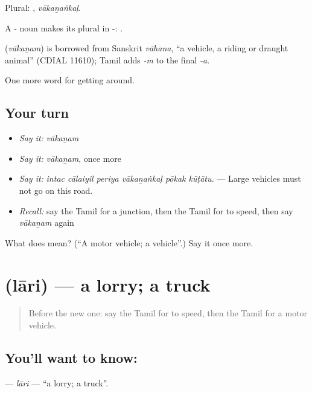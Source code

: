 Plural: , \emph{vākaṉaṅkaḷ}.

A - noun makes its plural in -: .

\begin{cousinweb}
\textbf{} (\emph{vākaṉam}) is borrowed from Sanskrit \emph{vāhana}, \textquotedblleft{}a vehicle, a riding or draught animal\textquotedblright{} (CDIAL 11610); Tamil adds \emph{-m} to the final \emph{-a}.
\end{cousinweb}

\begin{grammarlens}[title={What you've built}]
One more word for getting around.
\end{grammarlens}

\subsection*{Your turn}
\begin{itemize}
\raggedright
  \item \emph{Say it:} \emph{vākaṉam}
  \item \emph{Say it:} \emph{vākaṉam}, once more
  \item \emph{Say it:} \emph{intac cālaiyil periya vākaṉaṅkaḷ pōkak kūṭātu.} — Large vehicles must not go on this road.
  \item \emph{Recall:} say the Tamil for a junction, then the Tamil for to speed, then say \emph{vākaṉam} again
\end{itemize}

\begin{tcolorbox}[breakable,colback=teal!4,colframe=teal!35!black,title={Before you move on}]
What does  mean? (\textquotedblleft{}A motor vehicle; a vehicle\textquotedblright{}.) Say it once more.
\end{tcolorbox}
\section[\texorpdfstring{\ta{லாரி} (lāri)}{லாரி (lāri)}]{ (lāri) — a lorry; a truck}

\label{lesson:TA-C404-lari}



\begin{quote}
Before the new one: say the Tamil for to speed, then the Tamil for a motor vehicle.
\end{quote}

\subsection*{You'll want to know: }
\textbf{} — \emph{lāri} — \textquotedblleft{}a lorry; a truck\textquotedblright{}.

